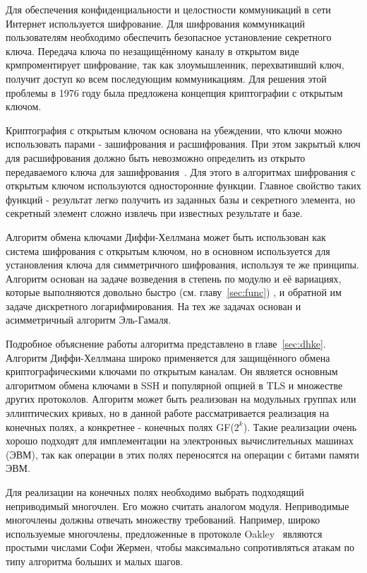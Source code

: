 \documentclass[times,specification,annotation]{itmo-student-thesis}
\begin{document}
Для обеспечения конфиденциальности и целостности коммуникаций в сети Интернет используется шифрование.
Для шифрования коммуникаций пользователям необходимо обеспечить безопасное установление секретного ключа.
Передача ключа по незащищённому каналу в открытом виде крмпроментирует шифрование, так как
злоумышленник, перехвативший ключ, получит доступ ко всем последующим коммуникациям.
Для решения этой проблемы в 1976 году была предложена концепция криптографии с открытым ключом.\par
Криптография с открытым ключом основана на убеждении, что ключи можно использовать парами - зашифрования и расшифрования.
При этом закрытый ключ для расшифрования должно быть невозможно определить из открыто передаваемого ключа для зашифрования~\cite{dif77}.
Для этого в алгоритмах шифрования с открытым ключом используются односторонние функции.
Главное свойство таких функций - результат легко получить из заданных базы и секретного элемента, но секретный элемент
сложно извлечь при известных результате и базе.\par
Алгоритм обмена ключами Диффи-Хеллмана может быть использован как система шифрования с открытым ключом, но в основном
используется для установления ключа для симметричного шифрования, используя те же принципы.
Алгоритм основан на задаче возведения в степень по модулю и её вариациях, которые выполняются довольно быстро (см. главу~\ref{sec:func})
, и обратной им задаче дискретного логарифмирования.
На тех же задачах основан и асимметричный алгоритм Эль-Гамаля.\par
Подробное объяснение работы алгоритма представлено в главе~\ref{sec:dhke}.
Алгоритм Диффи-Хеллмана широко применяется для защищённого обмена криптографическими ключами
по открытым каналам.
Он является основным алгоритмом обмена ключами в SSH и популярной опцией в TLS и множестве других протоколов.
Алгоритм может быть реализован на модульных группах или эллиптических кривых, но в данной работе рассматривается
реализация на конечных полях, а конкретнее - конечных полях GF($2^k$).
Такие реализации очень хорошо подходят для имплементации на электронных вычислительных машинах (ЭВМ),
так как операции в этих полях переносятся на операции с битами памяти ЭВМ.\par
Для реализации на конечных полях необходимо выбрать подходящий неприводимый многочлен.
Его можно считать аналогом модуля.
Неприводимые многочлены должны отвечать множеству требований.
Например, широко используемые многочлены, предложенные в протоколе Oakley~\cite{rfc2412} являются простыми числами
Софи Жермен, чтобы максимально сопротивляться атакам по типу алгоритма больших и малых шагов.
\end{document}
